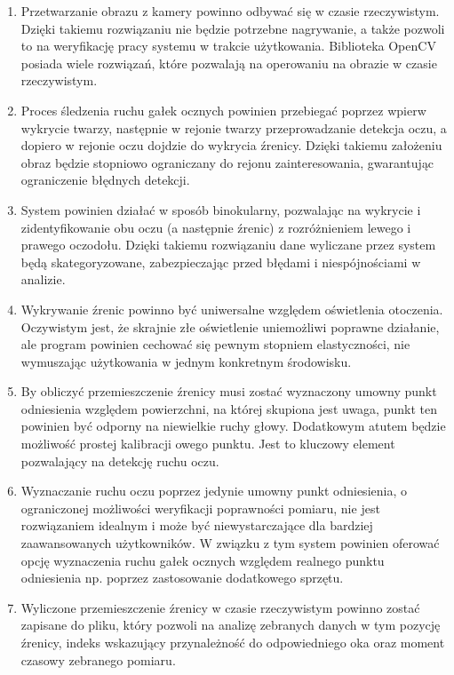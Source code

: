 \documentclass[a4paper,twoside,12pt]{book}
\begin{document}
\begin{enumerate}
	\item Przetwarzanie obrazu z kamery powinno odbywać się w czasie rzeczywistym. Dzięki takiemu rozwiązaniu nie będzie potrzebne nagrywanie, a także pozwoli to na weryfikację pracy systemu w trakcie użytkowania. Biblioteka OpenCV posiada wiele rozwiązań, które pozwalają na operowaniu na obrazie w czasie rzeczywistym.
	\item Proces śledzenia ruchu gałek ocznych powinien przebiegać poprzez wpierw wykrycie twarzy, następnie w rejonie twarzy przeprowadzanie detekcja oczu, a dopiero w rejonie oczu dojdzie do wykrycia źrenicy. Dzięki takiemu założeniu obraz będzie stopniowo ograniczany do rejonu zainteresowania, gwarantując ograniczenie błędnych detekcji.
	\item System powinien działać w sposób binokularny, pozwalając na wykrycie i zidentyfikowanie obu oczu (a następnie źrenic) z rozróżnieniem lewego i prawego oczodołu. Dzięki takiemu rozwiązaniu dane wyliczane przez system będą skategoryzowane, zabezpieczając przed błędami i niespójnościami w analizie.
	\item Wykrywanie źrenic powinno być uniwersalne względem oświetlenia otoczenia. Oczywistym jest, że skrajnie złe oświetlenie uniemożliwi poprawne działanie, ale program powinien cechować się pewnym stopniem elastyczności, nie wymuszając użytkowania w jednym konkretnym środowisku.
	\item By obliczyć przemieszczenie źrenicy musi zostać wyznaczony umowny punkt odniesienia względem powierzchni, na której skupiona jest uwaga, punkt ten powinien być odporny na niewielkie ruchy głowy. Dodatkowym atutem będzie możliwość prostej kalibracji owego punktu. Jest to kluczowy element pozwalający na detekcję ruchu oczu.
	\item Wyznaczanie ruchu oczu poprzez jedynie umowny punkt odniesienia, o ograniczonej możliwości weryfikacji poprawności pomiaru, nie jest rozwiązaniem idealnym i może być niewystarczające dla bardziej zaawansowanych użytkowników. W związku z tym system powinien oferować opcję wyznaczenia ruchu gałek ocznych względem realnego punktu odniesienia np. poprzez zastosowanie dodatkowego sprzętu.
	\item Wyliczone przemieszczenie źrenicy w czasie rzeczywistym powinno zostać zapisane do pliku, który pozwoli na analizę zebranych danych w tym pozycję źrenicy, indeks wskazujący przynależność do odpowiedniego oka oraz moment czasowy zebranego pomiaru.
\end{enumerate}
\end{document}
